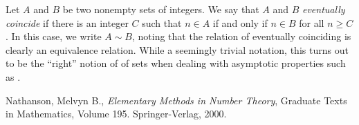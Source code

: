 \documentclass[12pt]{article}
\newcommand{\<}{\langle}
\renewcommand{\>}{\rangle}
\begin{document}
Let $A$ and $B$ be two nonempty sets of integers.  We say that $A$ and $B$ \emph{eventually coincide} if there is an integer $C$ such that $n\in A$ if and only if $n\in B$ for all $n\geq C$.  In this case, we write $A\sim B$, noting that the relation of eventually coinciding is clearly an equivalence relation.  While a seemingly trivial notation, this turns out to be the ``right'' notion of  of sets when dealing with asymptotic properties such as .


\begin{thebibliography}{9}
Nathanson, Melvyn B., \emph{Elementary Methods in Number Theory}, Graduate Texts in Mathematics, Volume 195.  Springer-Verlag, 2000.
\end{thebibliography}
\end{document}
